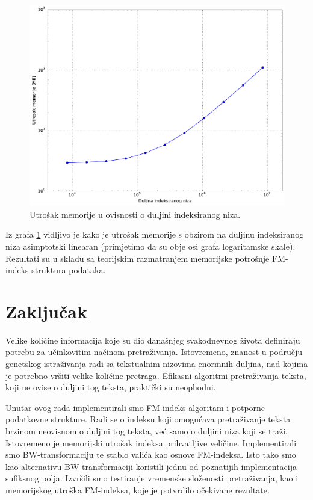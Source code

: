 \documentclass[times, utf8, seminar, numeric]{fer}
\begin{document}
\begin{figure}[!htb]
\centering
\includegraphics[width=\textwidth]{fig/test_res_seq_len_mem.pdf}
\caption{Utrošak memorije u ovisnosti o duljini indeksiranog niza.}
\label{fig:test_res_seq_len_mem}
\end{figure}

Iz grafa \ref{fig:test_res_seq_len_mem} vidljivo je kako je utrošak memorije s obzirom na
duljinu indeksiranog niza asimptotski linearan (primjetimo da su obje osi grafa logaritamske skale).
Rezultati su u skladu sa teorijskim razmatranjem memorijske potrošnje FM-indeks struktura podataka.

\chapter{Zaključak}

Velike količine informacija koje su dio današnjeg svakodnevnog života definiraju potrebu
za učinkovitim načinom pretraživanja. Istovremeno, znanost u području genetskog istraživanja
radi sa tekstualnim nizovima enormnih duljina, nad kojima je potrebno vršiti velike količine
pretraga. Efikasni algoritmi pretraživanja teksta, koji ne ovise o duljini tog teksta,
praktički su neophodni.

Unutar ovog rada implementirali smo FM-indeks algoritam i potporne podatkovne strukture.
Radi se o indeksu koji omogućava pretraživanje teksta brzinom neovisnom o duljini tog
teksta, već samo o duljini niza koji se traži. Istovremeno je memorijski utrošak
indeksa prihvatljive veličine. Implementirali smo BW-transformaciju te stablo valića
kao osnove FM-indeksa. Isto tako smo kao alternativu BW-transformaciji koristili
jednu od poznatijih implementacija sufiksnog polja. Izvršili smo testiranje vremenske
složenosti pretraživanja, kao i memorijskog utroška FM-indeksa, koje je potvrdilo očekivane
rezultate.



\end{document}
